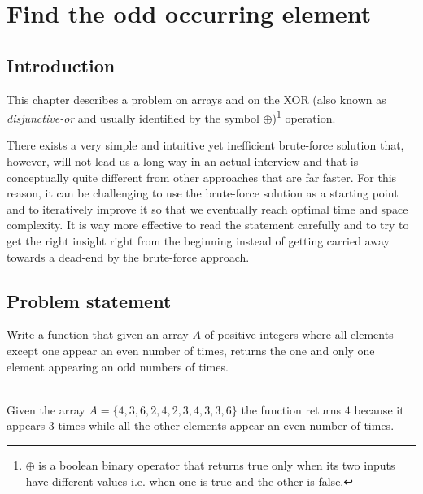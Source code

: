 %

\chapter{Find the odd occurring element}
\label{ch:find_odd_occurring_element}
\section*{Introduction}

This chapter describes a problem on arrays and on the XOR (also known as \textit{disjunctive-or} and usually identified by the symbol
$\oplus$)\footnote{
	$\oplus$ is a boolean binary operator that returns true only when its two inputs have different values i.e. when one is true and the other is false.} 
operation.

There exists a very simple and intuitive yet inefficient brute-force solution that, however, will not lead us a long way in an actual interview and that is conceptually quite different from other approaches that are far faster. For this reason, it can be challenging to use the brute-force solution as a starting point and to iteratively improve it so that we eventually reach optimal time and space complexity. It is way more effective to read the statement carefully and to try to get the right insight right from the beginning instead of getting carried away towards a dead-end by the brute-force approach.

\section{Problem statement}
\begin{exercise}
Write a function that given an array $A$ of positive integers where all elements except one appear an even number of times, returns the one and only one element appearing an odd numbers of times.

	\begin{example}
		\label{ex:find_odd_occurring_element:example1}
		\hfill \\
		Given the array $A=\{4,3,6,2,4,2,3,4,3,3,6\}$ the function returns $4$ because it appears $3$ times while all the other elements appear an even number of times.
		
	\end{example}
\end{exercise}


